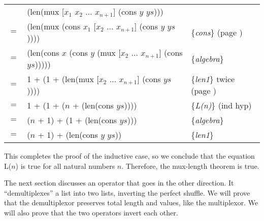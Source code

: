 \begin{center}
\begin{tabular}{lll}
    & (len(mux [$x_1$ $x_2$ $\dots$ $x_{n+1}$] (cons $y$ $ys$)))             &   \\
$=$ & (len(mux (cons $x_1$ [$x_2$ $\dots$ $x_{n+1}$] (cons $y$ $ys$))))      & \{\emph{cons}\} (page \pageref{cons-axiom-informal}) \\
$=$ & (len(cons $x$ (cons $y$ (mux [$x_2$ $\dots$ $x_{n+1}$] (cons $ys$))))) & \{\emph{algebra}\} \\
$=$ & 1 + (1 + (len(mux [$x_2$ $\dots$ $x_{n+1}$] (cons $ys$))))             & \{\emph{len1}\} twice (page \pageref{len-equations}) \\
$=$ & 1 + (1 + ($n$ + (len(cons $ys$))))                                     & \{\emph{L(n)}\} (ind hyp) \\
$=$ & ($n$ + 1) + (1 + (len(cons $ys$)))                                     & \{\emph{algebra}\} \\
$=$ & ($n$ + 1) + (len(cons $y$ $ys$))                                       & \{\emph{len1}\} \\
\end{tabular}
\end{center}

This completes the proof of the inductive case,
so we conclude that the equation L($n$) is true for all natural numbers $n$.
Therefore, the mux-length theorem is true.

The next section discusses an operator that goes in the other direction.
It ``demultiplexes'' a list into two lists, inverting the perfect shuffle.
We will prove that the demultiplexor preserves total length and values,
like the multiplexor.
We will also prove that the two operators invert each other.

